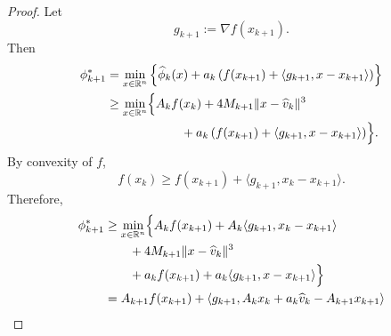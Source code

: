 \begin{itemize}
{\begin{proof}
                  Let
                  \[
                      g_{k+1}:=\nabla f(x_{k+1}).
                  \]
                  Then
                  \begin{align*}
                      \phi_{k+1}^*
                       & =
                      \min_{x\in\mathbb R^n}
                      \left\{
                      \widehat \phi_k(x)
                      +
                      a_k
                      \left(
                      f(x_{k+1})
                      +
                      \langle g_{k+1},x-x_{k+1}\rangle
                      \right)
                      \right\}                     \\
                       & \ge
                      \min_{x\in\mathbb R^n}
                      \Bigl\{
                      A_k f(x_k)
                      +
                      4M_{k+1}\|x-\widehat v_k\|^3 \\
                       & \qquad\qquad\qquad
                      +
                      a_k
                      \left(
                      f(x_{k+1})
                      +
                      \langle g_{k+1},x-x_{k+1}\rangle
                      \right)
                      \Bigr\}.
                  \end{align*}
                  By convexity of \(f\),
                  \[
                      f(x_k)
                      \ge
                      f(x_{k+1})+\langle g_{k+1},x_k-x_{k+1}\rangle.
                  \]
                  Therefore,
                  \begin{align*}
                      \phi_{k+1}^*
                       & \ge
                      \min_{x\in\mathbb R^n}
                      \Bigl\{
                      A_k f(x_{k+1})
                      +
                      A_k\langle g_{k+1},x_k-x_{k+1}\rangle \\
                       & \qquad
                      +
                      4M_{k+1}\|x-\widehat v_k\|^3          \\
                       & \qquad
                      +
                      a_k f(x_{k+1})
                      +
                      a_k\langle g_{k+1},x-x_{k+1}\rangle
                      \Bigr\}                               \\
                       & =
                      A_{k+1}f(x_{k+1})
                      +
                      \left\langle g_{k+1},
                      A_kx_k+a_k\widehat v_k-A_{k+1}x_{k+1}
                      \right\rangle                         \\

\end{align*}
\end{proof}}
\end{itemize}
